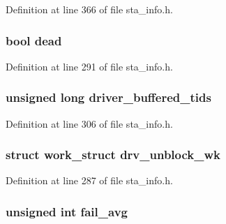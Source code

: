 Definition at line 366 of file sta\-\_\-info.\-h.

\hypertarget{structsta__info_a79810da189102ac7036cb8eca47d104d}{
\subsubsection[{dead}]{\setlength{\rightskip}{0pt plus 5cm}bool dead}}\label{structsta__info_a79810da189102ac7036cb8eca47d104d}


Definition at line 291 of file sta\-\_\-info.\-h.

\hypertarget{structsta__info_ad258a0c1471c80553236dd314610d03e}{
\subsubsection[{driver\-\_\-buffered\-\_\-tids}]{\setlength{\rightskip}{0pt plus 5cm}unsigned long driver\-\_\-buffered\-\_\-tids}}\label{structsta__info_ad258a0c1471c80553236dd314610d03e}


Definition at line 306 of file sta\-\_\-info.\-h.

\hypertarget{structsta__info_a2c95e461fff888fae360c7a55a151223}{
\subsubsection[{drv\-\_\-unblock\-\_\-wk}]{\setlength{\rightskip}{0pt plus 5cm}struct work\-\_\-struct drv\-\_\-unblock\-\_\-wk}}\label{structsta__info_a2c95e461fff888fae360c7a55a151223}


Definition at line 287 of file sta\-\_\-info.\-h.

\hypertarget{structsta__info_a2e8ebe1593e8bfdb0696ad9adbab7209}{
\subsubsection[{fail\-\_\-avg}]{\setlength{\rightskip}{0pt plus 5cm}unsigned int fail\-\_\-avg}}\label{structsta__info_a2e8ebe1593e8bfdb0696ad9adbab7209}


